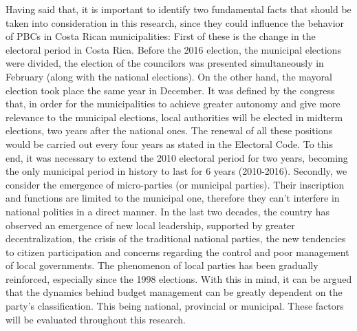 Having said that, it is important to identify two fundamental facts that should be taken into consideration in this research, since they could influence the behavior of PBCs in Costa Rican municipalities: First of these is the change in the electoral period in Costa Rica. Before the 2016 election, the municipal elections were divided, the election of the councilors was presented simultaneously in February (along with the national elections). On the other hand, the mayoral election took place the same year in December. It was defined by the congress that, in order for the municipalities to achieve greater autonomy and give more relevance to the municipal elections, local authorities will be elected in midterm elections, two years after the national ones. The renewal of all these positions would be carried out every four years as stated in the Electoral Code. \parencite[Art. 150]{al2009} To this end, it was necessary to extend the 2010 electoral period for two years, becoming the only municipal period in history to last for 6 years (2010-2016). Secondly, we consider the emergence of micro-parties (or municipal parties). Their inscription and functions are limited to the municipal one, therefore they can't interfere in national politics in a direct manner. In the last two decades, the country has observed an emergence of new local leadership, supported by greater decentralization, the crisis of the traditional national parties, the new tendencies to citizen participation and concerns regarding the control and poor management of local governments. \parencite[p. 165]{blanco2011} The phenomenon of local parties has been gradually reinforced, especially since the 1998 elections. \parencite[p. 15]{beers2006} With this in mind, it can be argued that the dynamics behind budget management can be greatly dependent on the party's classification. This being national, provincial or municipal. These factors will be evaluated throughout this research. 
